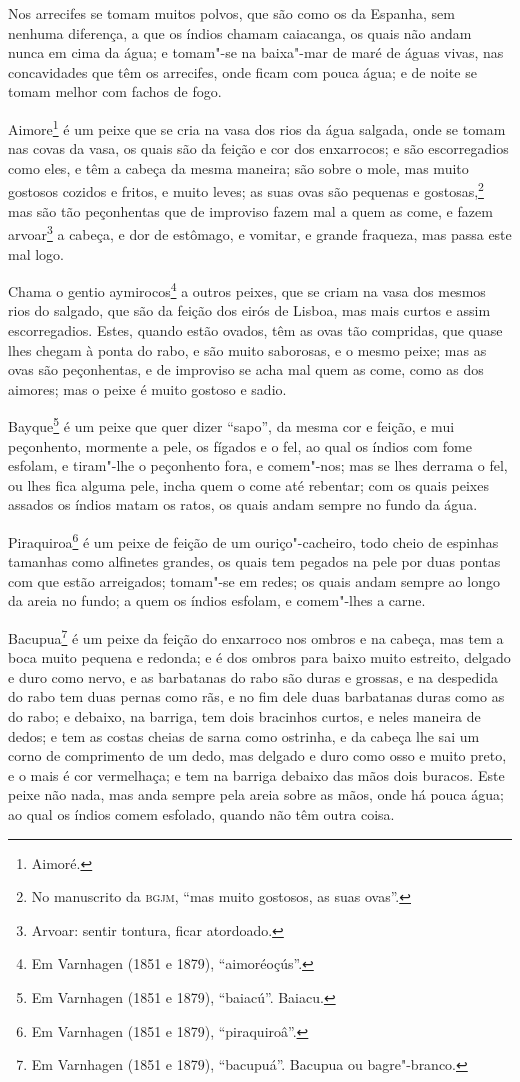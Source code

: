 Nos arrecifes se tomam muitos polvos, que são como os da Espanha, sem nenhuma diferença, a
que os índios chamam caiacanga, os quais não andam nunca em cima da água; e tomam"-se na
baixa"-mar de maré de águas vivas, nas concavidades que têm os arrecifes, onde ficam com
pouca água; e de noite se tomam melhor com fachos de fogo.

Aimore\footnote{ Aimoré.} é um peixe que se cria na vasa dos rios da água salgada, onde se
tomam nas covas da vasa, os quais são da feição e cor dos enxarrocos; e são escorregadios
como eles, e têm a cabeça da mesma maneira; são sobre o mole, mas muito gostosos cozidos e
fritos, e muito leves; as suas ovas são pequenas e gostosas,\footnote{ No manuscrito da
\textsc{bgjm}, ``mas muito gostosos, as suas ovas''.} mas são tão peçonhentas que de
improviso fazem mal a quem as come, e fazem arvoar\footnote{ Arvoar: sentir tontura, ficar
atordoado.} a cabeça, e dor de estômago, e vomitar, e grande fraqueza, mas
passa este mal logo.

Chama o gentio aymirocos\footnote{ Em Varnhagen (1851 e 1879), ``aimoréoçús''.} a outros
peixes, que se criam na vasa dos mesmos rios do salgado, que são da feição dos eirós de
Lisboa, mas mais curtos e assim escorregadios. Estes, quando estão ovados, têm as ovas tão
compridas, que quase lhes chegam à ponta do rabo, e são muito saborosas, e o mesmo peixe;
mas as ovas são peçonhentas, e de improviso se acha mal quem as come, como as dos aimores;
mas o peixe é muito gostoso e sadio.

Bayque\footnote{ Em Varnhagen (1851 e 1879), ``baiacú''. Baiacu.} é um peixe que quer
dizer ``sapo'', da mesma cor e feição, e mui peçonhento, mormente a pele, os fígados e o
fel, ao qual os índios com fome esfolam, e tiram"-lhe o peçonhento fora, e comem"-nos; mas
se lhes derrama o fel, ou lhes fica alguma pele, incha quem o come até rebentar; com os
quais peixes assados os índios matam os ratos, os quais andam sempre no fundo da água.

Piraquiroa\footnote{ Em Varnhagen (1851 e 1879), ``piraquiroâ''.} é um peixe de feição de
um ouriço"-cacheiro, todo cheio de espinhas tamanhas como alfinetes grandes, os quais tem
pegados na pele por duas pontas com que estão arreigados; tomam"-se em redes; os quais
andam sempre ao longo da areia no fundo; a quem os índios esfolam, e comem"-lhes a carne.

Bacupua\footnote{ Em Varnhagen (1851 e 1879), ``bacupuá''. Bacupua ou bagre"-branco.} é um
peixe da feição do enxarroco nos ombros e na cabeça, mas tem a boca muito pequena e
redonda; e é dos ombros para baixo muito estreito, delgado e duro como nervo, e as
barbatanas do rabo são duras e grossas, e na despedida do rabo tem duas pernas como rãs, e
no fim dele duas barbatanas duras como as do rabo; e debaixo, na barriga, tem dois
bracinhos curtos, e neles maneira de dedos; e tem as costas cheias de sarna como ostrinha,
e da cabeça lhe sai um corno de comprimento de um dedo, mas delgado e duro como osso e
muito preto, e o mais é cor vermelhaça; e tem na barriga debaixo das mãos dois buracos.
Este peixe não nada, mas anda sempre pela areia sobre as mãos, onde há pouca água; ao qual
os índios comem esfolado, quando não têm outra coisa.

